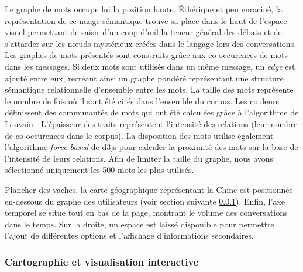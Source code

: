     Le graphe de mots occupe lui la position haute. Éthérique et peu enraciné, la représentation de ce nuage sémantique trouve sa place dans le haut de l'espace visuel permettant de saisir d'un coup d’œil la teneur général des débats et de s'attarder sur les nœuds mystérieux créées dans le langage lors des conversations. Les graphes de mots présentés sont construits gr\^ace aux co-occurences de mots dans les messages. Si deux mots sont utilisés dans un m\^eme message, un \textit{edge} est ajouté entre eux, recréant ainsi un graphe pondéré représentant une structure sémantique relationnelle d{\textquoteright}ensemble entre les mots. La taille des mots représente le nombre de fois o\`u il sont été cités dans l{\textquoteright}ensemble du corpus. Les couleurs définissent des communautés de mots qui ont été calculées gr\^ace à l{\textquoteright}algorithme de Louvain \citep{Blondel2008}. L{\textquoteright}épaisseur des traits représentent l{\textquoteright}intensité des relations (leur nombre de co-occurences dans le corpus). La disposition des mots utilise également l{\textquoteright}algorithme \textit{force-based} de d3js \citep{Bostock2011} pour calculer la proximité des mots sur la base de l{\textquoteright}intensité de leurs relations. Afin de limiter la taille du graphe, nous avons sélectionné uniquement les 500 mots les plus utilisés.  


    Plancher des vaches, la carte géographique représentant la Chine est positionnée en-dessous du graphe des utilisateurs (voir section suivante \ref{sec:le_temps_et_la_carte}). Enfin, l'axe temporel se situe tout en bas de la page, montrant le volume des conversations dans le temps. Sur la droite, un espace est laissé disponible pour permettre l'ajout de différentes options et l'affichage d'informations secondaires.
    

\subsubsection{Cartographie et visualisation interactive} 
\label{sec:le_temps_et_la_carte}
    
